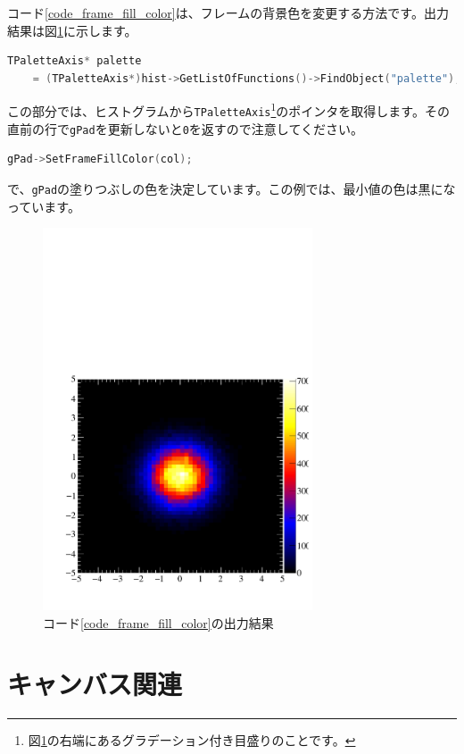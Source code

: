 \begin{NoFloat}

\end{NoFloat}

コード\ref{code_frame_fill_color}は、フレームの背景色を変更する方法です。出力結果は図\ref{fig_frame_fill_color_pdf}に示します。

\begin{lstlisting}[language=C++]
  TPaletteAxis* palette 
    = (TPaletteAxis*)hist->GetListOfFunctions()->FindObject("palette"); 
\end{lstlisting}
この部分では、ヒストグラムから\texttt{TPaletteAxis}\footnote{図\ref{fig_frame_fill_color_pdf}の右端にあるグラデーション付き目盛りのことです。}のポインタを取得します。その直前の行で\texttt{gPad}を更新しないと\texttt{0}を返すので注意してください。
\begin{lstlisting}[language=C++]
  gPad->SetFrameFillColor(col); 
\end{lstlisting}
で、\texttt{gPad}の塗りつぶしの色を決定しています。この例では、最小値の色は黒になっています。

\begin{figure}
  \centering
  \includegraphics[width=8cm]{fig/frame_fill_color.pdf}
  \caption{コード\ref{code_frame_fill_color}の出力結果}
  \label{fig_frame_fill_color_pdf}
\end{figure}


\section{キャンバス関連}
